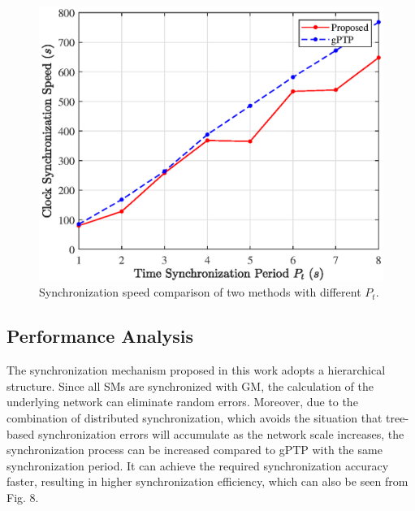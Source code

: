 \documentclass[conference]{IEEEtran}
\begin{document}
\begin{figure}[t]
	\centerline{\includegraphics[scale=0.6]{fig8.eps}}
	\caption{Synchronization speed comparison of two methods with different $P_t$.}
	\label{fig8}
\end{figure}

\subsection{Performance Analysis}
The synchronization mechanism proposed in this work adopts a hierarchical structure. Since all SMs are synchronized with GM, the calculation of the underlying network can eliminate random errors. Moreover, due to the combination of distributed synchronization, which avoids the situation that tree-based synchronization errors will accumulate as the network scale increases, the synchronization process can be increased compared to gPTP with the same synchronization period. It can achieve the required synchronization accuracy faster, resulting in higher synchronization efficiency, which can also be seen from Fig. 8. 

\end{document}

